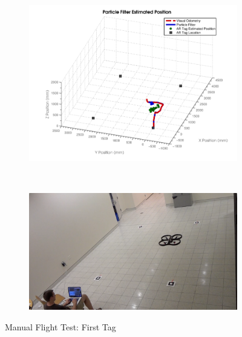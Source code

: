 	\begin{figure}[ht]
	        \centering
	        \begin{subfigure}[b]{0.9\textwidth}
	                \centering
	                \includegraphics[width=\textwidth]{../images/3dgraph_38.png}
	                \label{fig:tag1}
	        \end{subfigure}%
	        \\
	        \begin{subfigure}[b]{0.75\textwidth}
	                \centering
	                \includegraphics[width=\textwidth]{../images/frame1.png}
	                \label{fig:frame1}
	        \end{subfigure}
	        \caption{Manual Flight Test: First Tag}
	\end{figure}

